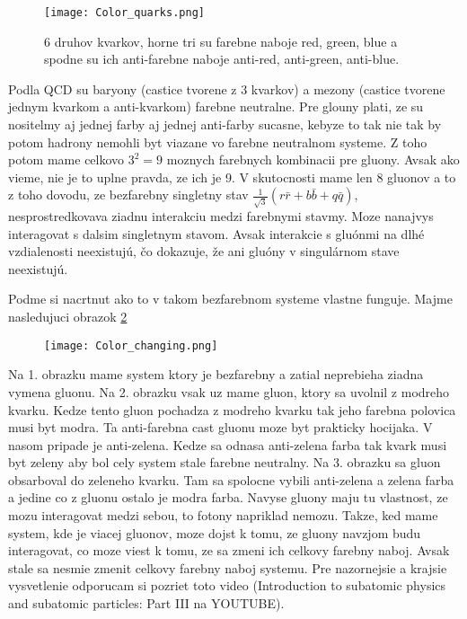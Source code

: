 \documentclass[../../main.tex]{subfiles}
\begin{document}
\begin{figure}[!h]
\centering
\texttt{[image: Color\_quarks.png]}
\caption{6 druhov kvarkov, horne tri su farebne naboje red, green, blue a spodne su ich anti-farebne naboje anti-red, anti-green, anti-blue.}
\label{sf1:fig:Color_quarks}
\end{figure}
\newline
Podla QCD su baryony (castice tvorene z 3 kvarkov) a mezony (castice tvorene jednym kvarkom a anti-kvarkom) farebne neutralne. Pre glouny plati, ze su nositelmy aj jednej farby aj jednej anti-farby sucasne, kebyze to tak nie tak by potom hadrony nemohli byt viazane vo farebne neutralnom systeme.  Z toho potom mame celkovo $3^2=9$ moznych farebnych kombinacii pre gluony. Avsak ako vieme, nie je to uplne pravda, ze ich je 9. V skutocnosti mame len 8 gluonov a to z toho dovodu, ze bezfarebny singletny stav $\frac{1}{\sqrt{3}}(r\bar{r}+b\bar{b}+q\bar{q})$, nesprostredkovava ziadnu interakciu medzi farebnymi stavmy. Moze nanajvys interagovat s dalsim singletnym stavom. Avsak interakcie s gluónmi na dlhé vzdialenosti neexistujú, čo dokazuje, že ani gluóny v singulárnom stave neexistujú.\par
Podme si nacrtnut ako to v takom bezfarebnom systeme vlastne funguje. Majme nasledujuci obrazok \ref{sf1:fig:Prechody}
\begin{figure}[!h]
\centering
\texttt{[image: Color\_changing.png]}
\caption{}
\label{sf1:fig:Prechody}
\end{figure}
\newline
Na 1. obrazku mame system ktory je bezfarebny a zatial neprebieha ziadna vymena gluonu. Na 2. obrazku vsak uz mame gluon, ktory sa uvolnil z modreho kvarku. Kedze tento gluon pochadza z modreho kvarku tak jeho farebna polovica musi byt modra. Ta anti-farebna cast gluonu moze byt prakticky hocijaka. V nasom pripade je anti-zelena. Kedze sa odnasa anti-zelena farba tak kvark musi byt zeleny aby bol cely system stale farebne neutralny. Na 3. obrazku sa gluon obsarboval do zeleneho kvarku. Tam sa spolocne vybili anti-zelena a zelena farba a jedine co z gluonu ostalo je modra farba. Navyse gluony maju tu vlastnost, ze mozu interagovat medzi sebou, to fotony napriklad nemozu. Takze, ked mame system, kde je viacej gluonov, moze dojst k tomu, ze gluony navzjom budu interagovat, co moze viest k tomu, ze sa zmeni ich celkovy farebny naboj. Avsak stale sa nesmie zmenit celkovy farebny naboj systemu. Pre nazornejsie a krajsie vysvetlenie odporucam si pozriet toto video (Introduction to subatomic physics and subatomic particles: Part III na YOUTUBE).\par
\end{document}
